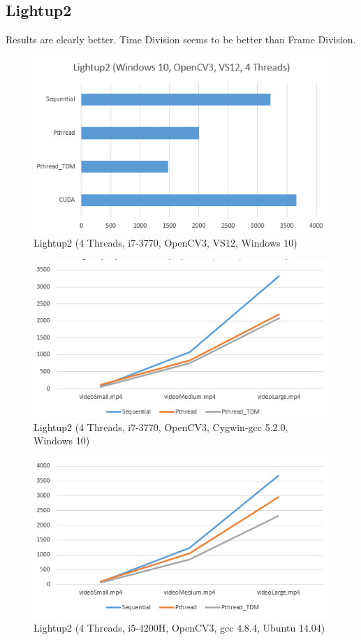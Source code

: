 \documentclass{acm_proc_article-sp}
\begin{document}
\subsection{Lightup2}
Results are clearly better. Time Division seems to be better than Frame Division.
\begin{figure}[H]
  \includegraphics[width=\linewidth,natwidth=526,natheight=313]{lightup2.png}
  \caption{Lightup2 (4 Threads, i7-3770, OpenCV3, VS12, Windows 10)}
  \label{fig:lightup2}
\end{figure}
\begin{figure}[H]
  \includegraphics[width=\linewidth,natwidth=535,natheight=285]{lightup2_sml.png}
  \caption{Lightup2 (4 Threads, i7-3770, OpenCV3, Cygwin-gcc 5.2.0, Windows 10)}
  \label{fig:lightup2_sml}
\end{figure}
\begin{figure}[H]
  \includegraphics[width=\linewidth,natwidth=536,natheight=290]{lightup2_ubuntu.png}
  \caption{Lightup2 (4 Threads, i5-4200H, OpenCV3, gcc 4.8.4, Ubuntu 14.04)}
  \label{fig:lightup2_ubuntu}
\end{figure}
\end{document}
